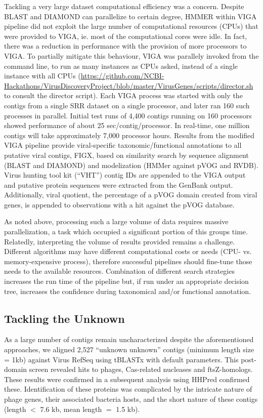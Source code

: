   Tackling a very large dataset computational efficiency was a concern. Despite
  BLAST and DIAMOND can parallelize to certain degree, HMMER within VIGA
  pipeline did not exploit the large number of computational resources (CPUs)
  that were provided to VIGA, ie. most of the computational cores were idle. In
  fact, there was a reduction in performance with the provision of more
  processors to VIGA. To partially mitigate this behaviour, VIGA was parallely
  invoked from the command line, to run as many instances as CPUs asked,
  instead of a single instance with all CPUs
  (\url{https://github.com/NCBI-Hackathons/VirusDiscoveryProject/blob/master/VirusGenes/scripts/director.sh}
  to consult the director script). Each VIGA process was started with only the
  contigs from a single SRR dataset on a single processor, and later ran 160
  such processes in parallel. Initial test runs of 4,400 contigs running on 160
  processors showed performance of about 25 sec/contig/processor. In real-time,
  one million contigs will take approximately 7,000 processor hours. Results
  from the modified VIGA pipeline provide viral-specific taxonomic/functional
  annotations to all putative viral contigs, FIGX, based on similarity search
  by sequence alignment (BLAST and DIAMOND) and modelization (HMMer against
  pVOG and RVDB). Virus hunting tool kit (“VHT”) contig IDs are appended to the
  VIGA output and putative protein sequences were extracted from the GenBank
  output. Additionally, viral quotient, the percentage of a pVOG domain created
  from viral genes, is appended to observations with a hit against the pVOG
  database.


  As noted above, processing such a large volume of data requires massive
  parallelization, a task which occupied a significant portion of this groups
  time. Relatedly, interpreting the volume of results provided remains a
  challenge. Different algorithms may have different computational costs or
  needs (CPU- vs. memory-expensive process), therefore successful pipelines
  should fine-tune those needs to the available resources. Combination of
  different search strategies increases the run time of the pipeline but, if
  run under an appropriate decision tree, increases the confidence during
  taxonomical and/or functional annotation.


  \subsection{Tackling the Unknown}
  As a large number of contigs remain uncharacterized despite the
  aforementioned approaches, we  aligned 2,527 “unknown unknown” contigs
  (minimum length size = 1kb) against Virus RefSeq using tBLASTx
  \cite{Camacho2009} with default parameters. This post-domain screen revealed
  hits to phages, Cas-related nucleases and ftsZ-homologs. These results were
  confirmed in a subsequent analysis using HHPred \cite{Hildebrand2009}
  confirmed these. Identification of these proteins was complicated by the
  intricate nature of phage genes, their associated bacteria hosts, and the
  short nature of these contigs (length $<$ 7.6 kb, mean length $=$ 1.5 kb).

